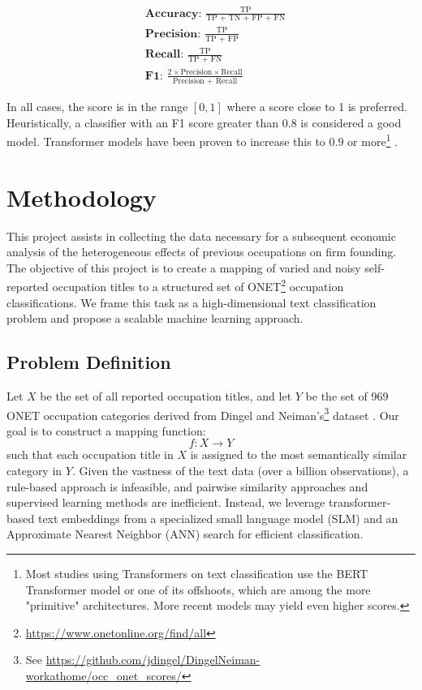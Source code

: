 \documentclass[12pt]{article}
\begin{document}
\begin{align*}
    &\textbf{Accuracy:  } \frac{\text{TP}}{\text{TP + TN + FP + FN}} \\
    & \textbf{Precision:  } \frac{\text{TP}}{\text{TP + FP}}\\
    &\textbf{Recall:  }\frac{\text{TP}}{\text{TP + FN}}\\
    &  \textbf{F1:  }  \frac{2 \times \text{Precision}\times \text{Recall}}{\text{Precision + Recall}}
\end{align*}

In all cases, the score is in the range $[0,1]$ where a score close to 1 is preferred. Heuristically, a classifier with an F1 score greater than $0.8$ is considered a good model. Transformer models have been proven to increase this to $0.9$ or more\footnote{Most studies using Transformers on text classification use the BERT Transformer model or one of its offshoots, which are among the more "primitive" architectures. More recent models may yield even higher scores.} \cite{lu2022comparative}\cite{transformer-text-class}\cite{gokhan-trans-text-class}. 

\section{Methodology}\label{sec:methodology}
This project assists in collecting the data necessary for a subsequent economic analysis of the heterogeneous effects of previous occupations on firm founding. The objective of this project is to create a mapping of varied and noisy self-reported occupation titles to a structured set of ONET\footnote{\href{https://www.onetonline.org/find/all}{https://www.onetonline.org/find/all}} occupation classifications. We frame this task as a high-dimensional text classification problem and propose a scalable machine learning approach.

\subsection{Problem Definition}

Let $X$ be the set of all reported occupation titles, and let $Y$ be the set of 969 ONET occupation categories derived from Dingel and Neiman's\footnote{See \href{https://github.com/jdingel/DingelNeiman-workathome/occ_onet_scores/output/occupations_workathome.csv}{https://github.com/jdingel/DingelNeiman-workathome/occ\_onet\_scores/}} dataset \cite{DINGEL2020} . 
Our goal is to construct a mapping function:
\[
f: X \to Y
\]
such that each occupation title in $X$ is assigned to the most semantically similar category in $Y$. Given the vastness of the text data (over a billion observations), a rule-based approach is infeasible, and pairwise similarity approaches and supervised learning methods are inefficient. Instead, we leverage transformer-based text embeddings from a specialized small language model (SLM) and an Approximate Nearest Neighbor (ANN) search for efficient classification.
\end{document}
